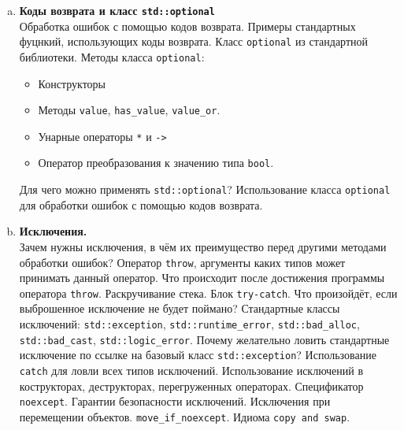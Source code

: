 \documentclass{article}
\begin{document}
\begin{enumerate}
\begin{enumerate}[a.]
\item \textbf{Коды возврата и класс \texttt{std::optional}}\\
Обработка ошибок с помощью кодов возврата. Примеры стандартных фуцнкий, использующих коды возврата.
Класс \texttt{optional} из стандартной библиотеки.
Методы класса \texttt{optional}:
\begin{itemize}
\item Конструкторы
\item Методы \texttt{value}, \texttt{has\_value}, \texttt{value\_or}.
\item Унарные операторы \texttt{*} и \texttt{->}
\item Оператор преобразования к значению типа \texttt{bool}.
\end{itemize}
Для чего можно применять \texttt{std::optional}? Использование класса \texttt{optional} для обработки ошибок с помощью кодов возврата.


\item \textbf{Исключения.}\\
Зачем нужны исключения, в чём их преимущество перед другими методами обработки ошибок?
Оператор \texttt{throw}, аргументы каких типов может принимать данный оператор. Что происходит после достижения программы оператора \texttt{throw}. Раскручивание стека. Блок \texttt{try-catch}. Что произойдёт, если выброшенное исключение не будет поймано? Стандартные классы исключений: \texttt{std::exception}, \texttt{std::runtime\_error}, \texttt{std::bad\_alloc}, \texttt{std::bad\_cast}, \texttt{std::logic\_error}. Почему желательно ловить стандартные исключение по ссылке на базовый класс \texttt{std::exception}? Использование \texttt{catch} для ловли всех типов исключений. Использование исключений в кострукторах, деструкторах, перегруженных операторах. Спецификатор \texttt{noexcept}. Гарантии безопасности исключений. Исключения при перемещении объектов. \texttt{move\_if\_noexcept}. Идиома \texttt{copy and swap}.

\end{enumerate}
\end{enumerate}
\end{document}
